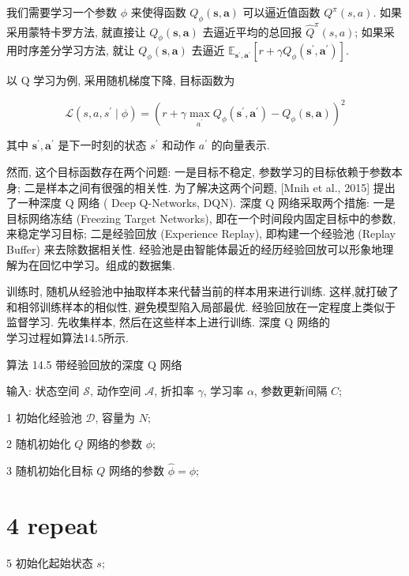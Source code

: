\documentclass[10pt]{article}
\begin{document}
我们需要学习一个参数 $\phi$ 来使得函数 $Q_{\phi}(\boldsymbol{s}, \boldsymbol{a})$ 可以逼近值函数 $Q^{\pi}(s, a)$. 如果采用蒙特卡罗方法, 就直接让 $Q_{\phi}(\boldsymbol{s}, \boldsymbol{a})$ 去逼近平均的总回报 $\hat{Q}^{\pi}(s, a)$; 如果采用时序差分学习方法, 就让 $Q_{\phi}(\boldsymbol{s}, \boldsymbol{a})$ 去逼近 $\mathbb{E}_{\boldsymbol{s}^{\prime}, \boldsymbol{a}^{\prime}}\left[r+\gamma Q_{\phi}\left(\boldsymbol{s}^{\prime}, \boldsymbol{a}^{\prime}\right)\right]$.

以 $\mathrm{Q}$ 学习为例, 采用随机梯度下降, 目标函数为


\begin{equation*}
\mathcal{L}\left(s, a, s^{\prime} \mid \phi\right)=\left(r+\gamma \max _{a^{\prime}} Q_{\phi}\left(\boldsymbol{s}^{\prime}, \boldsymbol{a}^{\prime}\right)-Q_{\phi}(\boldsymbol{s}, \boldsymbol{a})\right)^{2} \tag{14.43}
\end{equation*}


其中 $\boldsymbol{s}^{\prime}, \boldsymbol{a}^{\prime}$ 是下一时刻的状态 $s^{\prime}$ 和动作 $a^{\prime}$ 的向量表示.

然而, 这个目标函数存在两个问题: 一是目标不稳定, 参数学习的目标依赖于参数本身; 二是样本之间有很强的相关性. 为了解决这两个问题, [Mnih et al., 2015] 提出了一种深度 $\mathrm{Q}$ 网络 ( Deep Q-Networks, DQN). 深度 $\mathrm{Q}$ 网络采取两个措施: 一是目标网络冻结 (Freezing Target Networks), 即在一个时间段内固定目标中的参数, 来稳定学习目标; 二是经验回放 (Experience Replay), 即构建一个经验池 (Replay Buffer) 来去除数据相关性. 经验池是由智能体最近的经历经验回放可以形象地理解为在回忆中学习。组成的数据集.

训练时, 随机从经验池中抽取样本来代替当前的样本用来进行训练. 这样,就打破了和相邻训练样本的相似性, 避免模型陷入局部最优. 经验回放在一定程度上类似于监督学习. 先收集样本, 然后在这些样本上进行训练. 深度 $\mathrm{Q}$ 网络的\\
学习过程如算法14.5所示.

算法 14.5 带经验回放的深度 $\mathrm{Q}$ 网络

输入: 状态空间 $\mathcal{S}$, 动作空间 $\mathcal{A}$, 折扣率 $\gamma$, 学习率 $\alpha$, 参数更新间隔 $C$;

1 初始化经验池 $\mathcal{D}$, 容量为 $N$;

2 随机初始化 $Q$ 网络的参数 $\phi$;

3 随机初始化目标 $Q$ 网络的参数 $\hat{\phi}=\phi$;

\section*{4 repeat}
5 初始化起始状态 $s$;
\end{document}
